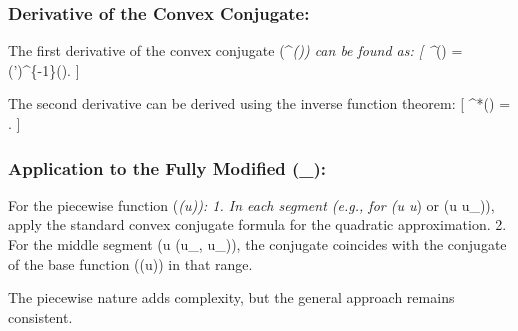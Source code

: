 \documentclass[
  letterpaper,
  DIV=11,
  numbers=noendperiod]{scrartcl}
\begin{document}
\subsubsection{Derivative of the Convex
Conjugate:}\label{derivative-of-the-convex-conjugate}

The first derivative of the convex conjugate (\gamma\^{}\emph{(\theta))
can be found as: {[}  \gamma\^{}}(\theta) =
(\gamma')\^{}\{-1\}(\theta). {]}

The second derivative can be derived using the inverse function theorem:
{[}  \gamma\^{}*(\theta) =
. {]}

\subsubsection{\texorpdfstring{Application to the Fully Modified
(\gamma\_\vartheta):}{Application to the Fully Modified (\_):}}\label{application-to-the-fully-modified-_}

For the piecewise function (\gamma\emph{\vartheta(u)): 1. In each
segment (e.g., for (u \geq u}\vartheta) or (u \leq u\_\varphi)), apply
the standard convex conjugate formula for the quadratic approximation.
2. For the middle segment (u \in (u\_\varphi, u\_\vartheta)), the
conjugate coincides with the conjugate of the base function (\gamma(u))
in that range.

The piecewise nature adds complexity, but the general approach remains
consistent.
\end{document}
